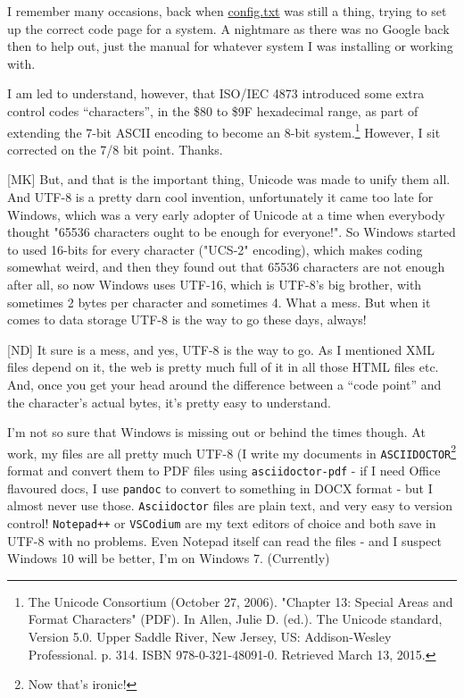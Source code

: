 I remember many occasions, back when \url{config.txt} was still a thing, trying to set up the correct code page for a system. A nightmare as there was no Google back then to help out, just the manual for whatever system I was installing or working with.

I am led to understand, however, that ISO/IEC 4873 introduced some extra control codes ``characters'', in the \$80 to \$9F hexadecimal range, as part of extending the 7-bit ASCII encoding to become an 8-bit system.\footnote{The Unicode Consortium (October 27, 2006). "Chapter 13: Special Areas and Format Characters" (PDF). In Allen, Julie D. (ed.). The Unicode standard, Version 5.0. Upper Saddle River, New Jersey, US: Addison-Wesley Professional. p. 314. ISBN 978-0-321-48091-0. Retrieved March 13, 2015.} However, I sit corrected on the 7/8 bit point. Thanks.


[MK] But, and that is the important thing, Unicode was made to unify them
all. And UTF-8 is a pretty darn cool invention, unfortunately it came
too late for Windows, which was a very early adopter of Unicode at a
time when everybody thought "65536 characters ought to be enough for
everyone!". So Windows started to used 16-bits for every character
("UCS-2" encoding), which makes coding somewhat weird, and then they
found out that 65536 characters are not enough after all, so now
Windows uses UTF-16, which is UTF-8's big brother, with sometimes 2
bytes per character and sometimes 4. What a mess. But when it comes to
data storage UTF-8 is the way to go these days, always!

[ND] It sure is a mess, and yes, UTF-8 is the way to go. As I mentioned XML files depend on it, the web is pretty much full of it in all those HTML files etc. And, once you get your head around the difference between a ``code point'' and the character's actual bytes, it's pretty easy to understand.

I'm not so sure that Windows is missing out or behind the times though. At work, my files are all pretty much UTF-8 (I write my documents in  \texttt{ASCIIDOCTOR}\footnote{Now that's ironic!} format and convert them to PDF files using  \texttt{asciidoctor-pdf} - if I need Office flavoured docs, I use  \texttt{pandoc} to convert to something in DOCX format - but I almost never use those.  \texttt{Asciidoctor} files are plain text, and very easy to version control!  \texttt{Notepad++} or  \texttt{VSCodium} are my text editors of choice and both save in UTF-8 with no problems. Even Notepad itself can read the files - and I suspect Windows 10 will be better, I'm on Windows 7. (Currently)

